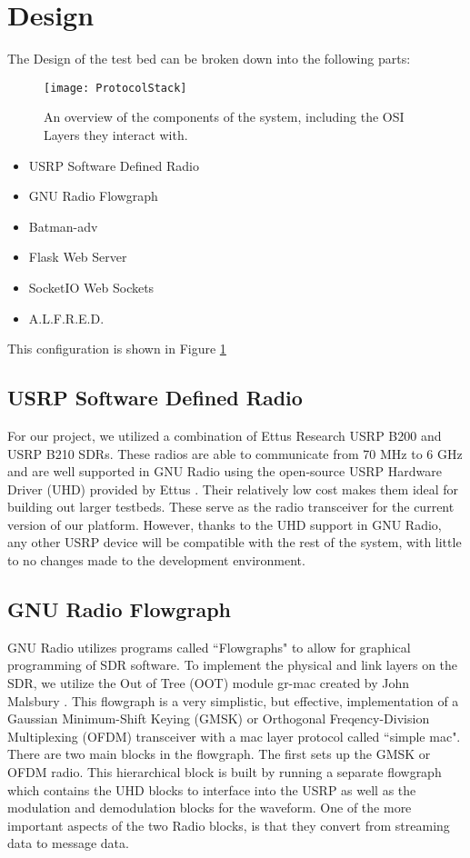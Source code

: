 \section{Design}

The Design of the test bed can be broken down into the following parts:

\begin{figure}
	\centering
	\texttt{[image: ProtocolStack]}
	\caption{An overview of the components of the system, including the OSI Layers they interact with. \cite{0003} \cite{0007} \cite{0008} \cite{0015} \cite{0012} \cite{0011}}
	\label{fig:ProtocolStack}
\end{figure}

\begin{itemize}
	\item USRP Software Defined Radio
	\item GNU Radio Flowgraph
	\item Batman-adv
	\item Flask Web Server
	\item SocketIO Web Sockets
	\item A.L.F.R.E.D. 
\end{itemize}

This configuration is shown in Figure \ref{fig:ProtocolStack}

\subsection{USRP Software Defined Radio}

For our project, we utilized a combination of Ettus Research USRP B200 and USRP B210 SDRs. These radios are able to communicate from 70 MHz to 6 GHz and are well supported in GNU Radio using the open-source USRP Hardware Driver (UHD) provided by Ettus \cite{0007}. Their relatively low cost makes them ideal for building out larger testbeds. These serve as the radio transceiver for the current version of our platform. However, thanks to the UHD support in GNU Radio, any other USRP device will be compatible with the rest of the system, with little to no changes made to the development environment. 

\subsection{GNU Radio Flowgraph}

GNU Radio utilizes programs called ``Flowgraphs" to allow for graphical programming of SDR software. To implement the physical and link layers on the SDR, we utilize the Out of Tree (OOT) module gr-mac created by John Malsbury \cite{0015}. This flowgraph is a very simplistic, but effective, implementation of a Gaussian Minimum-Shift Keying (GMSK) or Orthogonal Freqency-Division Multiplexing (OFDM) transceiver with a mac layer protocol called ``simple mac". There are two main blocks in the flowgraph. The first sets up the GMSK or OFDM radio. This hierarchical block is built by running a separate flowgraph which contains the UHD blocks to interface into the USRP as well as the modulation and demodulation blocks for the waveform. One of the more important aspects of the two Radio blocks, is that they convert from streaming data to message data. 

